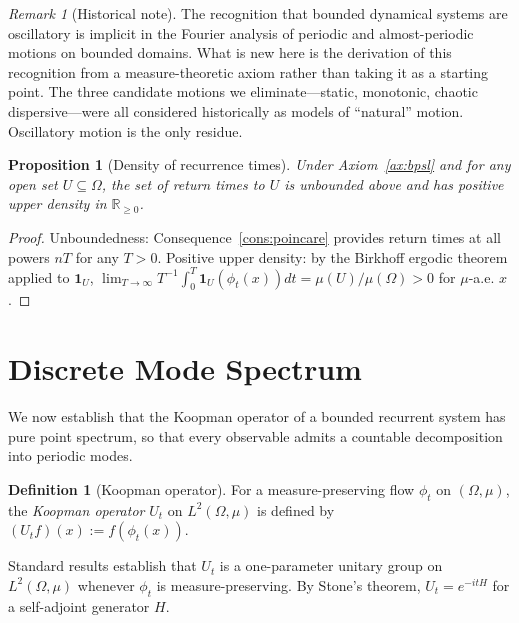 \documentclass[11pt,twocolumn,a4paper]{article}
\theoremstyle{axiomstyle}
\theoremstyle{conseqstyle}
\newtheorem{proposition}{Proposition}
\theoremstyle{definition}
\newtheorem{definition}{Definition}
\theoremstyle{remark}
\newtheorem*{remark}{Remark}
\newcommand{\Real}{\mathbb{R}}
\begin{document}
\begin{remark}[Historical note]
The recognition that bounded dynamical systems are oscillatory is implicit in the Fourier analysis of periodic and almost-periodic motions on bounded domains. What is new here is the derivation of this recognition from a measure-theoretic axiom rather than taking it as a starting point. The three candidate motions we eliminate---static, monotonic, chaotic dispersive---were all considered historically as models of ``natural'' motion. Oscillatory motion is the only residue.
\end{remark}

\begin{proposition}[Density of recurrence times]
\label{prop:densereturns}
Under Axiom~\ref{ax:bpsl} and for any open set $U\subseteq\Omega$, the set of return times to $U$ is unbounded above and has positive upper density in $\Real_{\ge 0}$.
\end{proposition}

\begin{proof}
Unboundedness: Consequence~\ref{cons:poincare} provides return times at all powers $nT$ for any $T>0$. Positive upper density: by the Birkhoff ergodic theorem applied to $\mathbf{1}_{U}$, $\lim_{T\to\infty}T^{-1}\int_{0}^{T}\mathbf{1}_{U}(\phi_{t}(x))dt=\mu(U)/\mu(\Omega)>0$ for $\mu$-a.e. $x$.
\end{proof}

\section{Discrete Mode Spectrum}
\label{sec:discretemodes}

We now establish that the Koopman operator of a bounded recurrent system has pure point spectrum, so that every observable admits a countable decomposition into periodic modes.

\begin{definition}[Koopman operator]
\label{def:koopman}
For a measure-preserving flow $\phi_{t}$ on $(\Omega,\mu)$, the \emph{Koopman operator} $U_{t}$ on $L^{2}(\Omega,\mu)$ is defined by $(U_{t}f)(x):=f(\phi_{t}(x))$.
\end{definition}

Standard results \citep{koopman1931,reed1980} establish that $U_{t}$ is a one-parameter unitary group on $L^{2}(\Omega,\mu)$ whenever $\phi_{t}$ is measure-preserving. By Stone's theorem, $U_{t}=e^{-itH}$ for a self-adjoint generator $H$.
\end{document}
